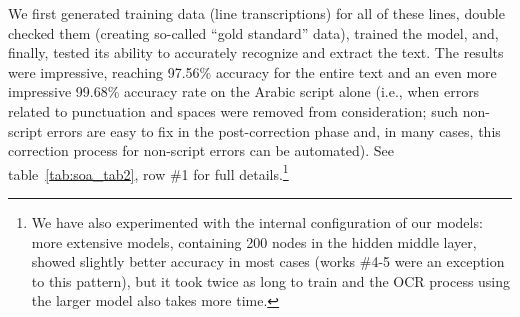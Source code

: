  We first generated training data (line transcriptions) for all of these lines,
 double checked them (creating so-called “gold standard” data), trained the
 model, and, finally, tested its ability to accurately recognize and extract
 the text. The results were impressive, reaching 97.56\% accuracy for the
 entire text and an even more impressive 99.68\% accuracy rate on the Arabic
 script alone (i.e., when errors related to punctuation and spaces were removed
 from consideration; such non-script errors are easy to fix in the
 post-correction phase and, in many cases, this correction process for
 non-script errors can be automated). See table~\ref{tab:soa_tab2}, row \#1 for
 full details.\footnote{We have also experimented with the internal
 configuration of our models: more extensive models, containing 200 nodes in
 the hidden middle layer, showed slightly better accuracy in most cases (works
 \#4-5 were an exception to this pattern), but it took twice as long to train
 and the OCR process using the larger model also takes more time.}

